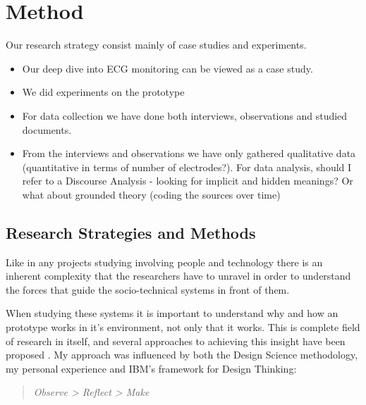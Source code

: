 \section{Method} %
\label{sec:method}

Our research strategy consist mainly of case studies and experiments.

\begin{itemize}

  \item Our deep dive into ECG monitoring can be viewed as a case study.

  \item We did experiments on the prototype

  \item For data collection we have done both interviews, observations and studied documents.

  \item From the interviews and observations we have only gathered qualitative data (quantitative in terms of number of electrodes?). For data analysis, should I refer to a Discourse Analysis - looking for implicit and hidden meanings? Or what about grounded theory (coding the sources over time)

\end{itemize}



\subsection{Research Strategies and Methods} %
\label{sub:research_strategies_and_methods}


Like in any projects studying involving people and technology there is an inherent complexity that the researchers have to unravel in order to understand the forces that guide the socio-technical systems in front of them.

When studying these systems it is important to understand why and how an prototype works in it's environment, not only that it works. This is complete field of research in itself, and several approaches to achieving this insight have been proposed \cite{Design_thinking_and_others_3}. My approach was influenced by both the Design Science methodology, my personal experience and IBM's framework for Design Thinking: 

\begin{quote} 
\textit{Observe > Reflect > Make}
\end{quote}


